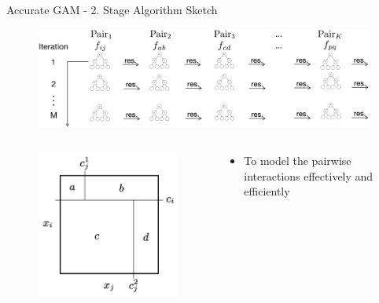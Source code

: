 \documentclass[11pt,compress,t,notes=noshow, aspectratio=169, xcolor=table]{beamer}
\begin{document}
\begin{frame}{Accurate GAM - 2. Stage Algorithm Sketch}
\begin{figure}
    \centering
    \includegraphics[width=1\linewidth]{figure/GA2M_Step1.png}
    \label{fig:GA2M_Step1}
\end{figure}
\begin{columns}[T, totalwidth=\textwidth]
    \begin{column}{0.4\textwidth} 
        \begin{figure}
            \vspace{-1.35cm} 
            \hspace{-0.8cm} 
            \includegraphics[width=0.8\linewidth]{figure/GA2M_Step0.png}
            \label{fig:GA2M_predictor}
        \end{figure}
    \end{column}
    \hfill
    \begin{column}{0.7\textwidth}
        \begin{itemize}
            \setlength{\leftskip}{-0.7cm}
            \vspace{-0.8cm}
            \item To model the pairwise interactions effectively and efficiently\\

\end{itemize}
\end{column}
\end{columns}
\end{frame}
\end{document}
